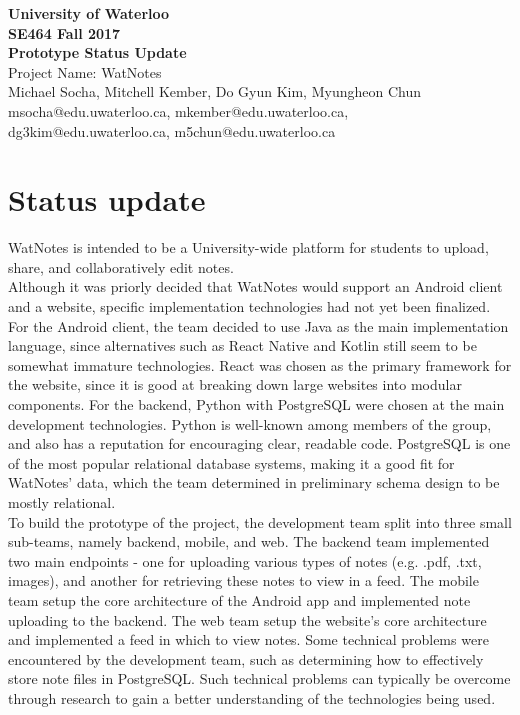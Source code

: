 \documentclass[12pt]{article}
\begin{document}
  \begin{center}
  \vspace*{\fill}
  {\Large\bf University of Waterloo}\\
  \vspace{3mm}
  {\large\bf SE464 Fall 2017}\\
  \vspace{3mm}
  {\Large\bf Prototype Status Update}\\
  \vspace{5mm}
  {\Large Project Name: WatNotes}\\
  \vspace{5mm}
  Michael Socha, Mitchell Kember, Do Gyun Kim, Myungheon Chun\\
  \vspace{3mm}
  msocha@edu.uwaterloo.ca, mkember@edu.uwaterloo.ca, dg3kim@edu.uwaterloo.ca, m5chun@edu.uwaterloo.ca\\
  \vspace*{\fill}
  \end{center}

  \newpage

\section{Status update}
  WatNotes is intended to be a University-wide platform for students to upload, share, and collaboratively edit notes. \\

  Although it was priorly decided that WatNotes would support an Android client and a website, specific implementation technologies had not yet been finalized. For the Android client, the team decided to use Java as the main implementation language, since alternatives such as React Native and Kotlin still seem to be somewhat immature technologies. React was chosen as the primary framework for the website, since it is good at breaking down large websites into modular components. For the backend, Python with PostgreSQL were chosen at the main development technologies. Python is well-known among members of the group, and also has a reputation for encouraging clear, readable code. PostgreSQL is one of the most popular relational database systems, making it a good fit for WatNotes' data, which the team determined in preliminary schema design to be mostly relational. \\

  To build the prototype of the project, the development team split into three small sub-teams, namely backend, mobile, and web. The backend team implemented two main endpoints - one for uploading various types of notes (e.g. .pdf, .txt, images), and another for retrieving these notes to view in a feed. The mobile team setup the core architecture of the Android app and implemented note uploading to the backend. The web team setup the website's core architecture and implemented a feed in which to view notes. Some technical problems were encountered by the development team, such as determining how to effectively store note files in PostgreSQL. Such technical problems can typically be overcome through research to gain a better understanding of the technologies being used. \\
\end{document}
